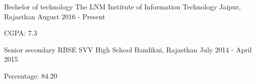 \begin{cventries}
  \cventry
    {Bechelor of technology}
    {The LNM Institute of Information Technology}
    {Jaipur, Rajasthan}
    {August 2016 - Present}
    {
      \begin{cvitems}
        \item {CGPA: 7.3}
      \end{cvitems}
    }
    
  \cventry
    {Senior secondary RBSE}
    {SVV High School}
    {Bandikui, Rajasthan}
    {July 2014 - April 2015}
    {
      \begin{cvitems}
        \item {Percentage: 84.20}
      \end{cvitems}
    }
\end{cventries}
